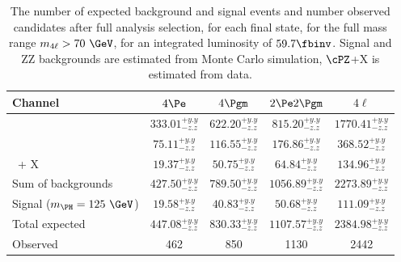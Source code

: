 \begin{table}[htb]
	\begin{center}
		\small
		\caption{The number of expected background and signal events 
			and number observed candidates after full analysis selection, for each final state, 
			for the full mass range $\mllll>70~\GeV$, for an integrated luminosity of $\usedLumiC$.
			Signal and ZZ backgrounds are estimated from Monte Carlo simulation,
			$\cPZ$+X is estimated from data.
			\label{tab:EventYieldsFull}}
			\begin{tabular}{l|c|c|c|c}
	\hline
	\hline
	\textbf{Channel} & $4\Pe$ & $4\Pgm$ & $2\Pe2\Pgm$ & $4\ell$ \\
	\hline
	\qqZZ & $333.01^{+ y.y}_{- z.z}$ & $622.20^{+ y.y}_{- z.z}$ & $815.20^{+ y.y}_{- z.z}$ & $1770.41^{+ y.y}_{- z.z}$ \\
	\ggZZ & $75.11^{+ y.y}_{- z.z}$ & $116.55^{+ y.y}_{- z.z}$ & $176.86^{+ y.y}_{- z.z}$ & $368.52^{+ y.y}_{- z.z}$ \\
	\cPZ\ + X & $19.37^{+ y.y}_{- z.z}$ & $50.75^{+ y.y}_{- z.z}$ & $64.84^{+ y.y}_{- z.z}$ & $134.96^{+ y.y}_{- z.z}$ \\
	\hline
	Sum of backgrounds & $427.50^{+ y.y}_{- z.z}$ & $789.50^{+ y.y}_{- z.z}$ & $1056.89^{+ y.y}_{- z.z}$ & $2273.89^{+ y.y}_{- z.z}$ \\
	\hline
	Signal ($\mH=125~\GeV$) & $19.58^{+ y.y}_{- z.z}$ & $40.83^{+ y.y}_{- z.z}$ & $50.68^{+ y.y}_{- z.z}$ & $111.09^{+ y.y}_{- z.z}$ \\
	\hline
	Total expected & $447.08^{+ y.y}_{- z.z}$ & $830.33^{+ y.y}_{- z.z}$ & $1107.57^{+ y.y}_{- z.z}$ & $2384.98^{+ y.y}_{- z.z}$ \\
	\hline
	Observed & 462 & 850 & 1130 & 2442 \\
	\hline
	\hline
\end{tabular}


\end{center}
\end{table}
